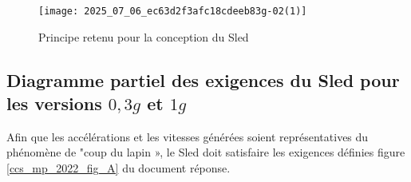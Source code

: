 \begin{figure}[!h]
\centering
\texttt{[image: 2025\_07\_06\_ec63d2f3afc18cdeeb83g-02(1)]}

\caption{Principe retenu pour la conception du Sled \label{ccs_mp_2022_fig_02}}
\end{figure}
\fi

\subsection{Diagramme partiel des exigences du Sled pour les versions $0,3 g$ et $1 g$ \label{ccs_mp_2022_sec_1B}}
\ifprof
\else
Afin que les accélérations et les vitesses générées soient représentatives du phénomène de "coup du lapin », le Sled doit satisfaire les exigences définies figure \ref{ccs_mp_2022_fig_A} du document réponse.
\fi

